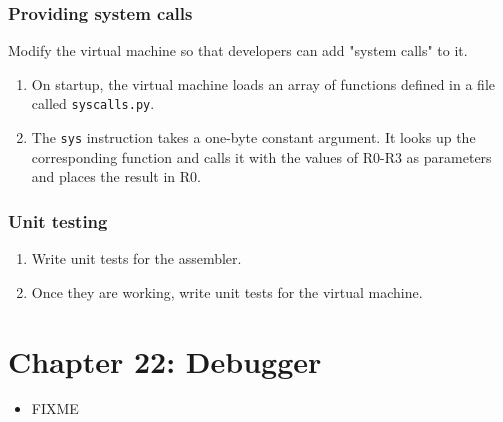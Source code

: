 \documentclass{scrbook}
\begin{document}
\subsection*{Providing system calls}


Modify the virtual machine so that developers can add "system calls" to it.

\begin{enumerate}

\item 

On startup,
    the virtual machine loads an array of functions defined in a file called \texttt{syscalls.py}.



\item 

The \texttt{sys} instruction takes a one-byte constant argument.
    It looks up the corresponding function and calls it with the values of R0-R3 as parameters
    and places the result in R0.



\end{enumerate}

\subsection*{Unit testing}

\begin{enumerate}

\item 

Write unit tests for the assembler.



\item 

Once they are working,
    write unit tests for the virtual machine.



\end{enumerate}

\chapter{Chapter 22: Debugger}\label{debugger}

\begin{itemize}

\item FIXME

\end{itemize}
\end{document}
